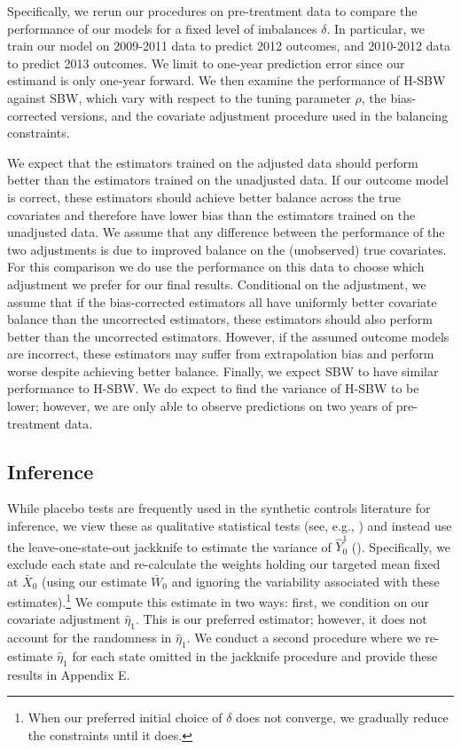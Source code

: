 \documentclass[aoas]{imsart}
\theoremstyle{plain}
\theoremstyle{remark}
\begin{document}
Specifically, we rerun our procedures on pre-treatment data to compare the performance of our models for a fixed level of imbalances $\delta$. In particular, we train our model on 2009-2011 data to predict 2012 outcomes, and 2010-2012 data to predict 2013 outcomes. We limit to one-year prediction error since our estimand is only one-year forward. We then examine the performance of H-SBW against SBW, which vary with respect to the tuning parameter $\rho$, the bias-corrected versions, and the covariate adjustment procedure used in the balancing constraints. 

We expect that the estimators trained on the adjusted data should perform better than the estimators trained on the unadjusted data. If our outcome model is correct, these estimators should achieve better balance across the true covariates and therefore have lower bias than the estimators trained on the unadjusted data. We assume that any difference between the performance of the two adjustments is due to improved balance on the (unobserved) true covariates. For this comparison we do use the performance on this data to choose which adjustment we prefer for our final results. Conditional on the adjustment, we assume that if the bias-corrected estimators all have uniformly better covariate balance than the uncorrected estimators, these estimators should also perform better than the uncorrected estimators. However, if the assumed outcome models are incorrect, these estimators may suffer from extrapolation bias and perform worse despite achieving better balance. Finally, we expect SBW to have similar performance to H-SBW. We do expect to find the variance of H-SBW to be lower; however, we are only able to observe predictions on two years of pre-treatment data.

\subsection{Inference}

While placebo tests are frequently used in the synthetic controls literature for inference, we view these as qualitative statistical tests (see, e.g., \cite{arkhangelsky2019synthetic}) and instead use the leave-one-state-out jackknife to estimate the variance of $\hat{Y}_0^1$ (\cite{cameron2015practitioner}). Specifically, we exclude each state and re-calculate the weights holding our targeted mean fixed at $\bar{X}_0$ (using our estimate $\bar{W}_0$ and ignoring the variability associated with these estimates).\footnote{When our preferred initial choice of $\delta$ does not converge, we gradually reduce the constraints until it does.} We compute this estimate in two ways: first, we condition on our covariate adjustment $\hat{\eta}_1$. This is our preferred estimator; however, it does not account for the randomness in $\hat{\eta}_1$. We conduct a second procedure where we re-estimate $\hat{\eta}_1$ for each state omitted in the jackknife procedure and provide these results in Appendix E.
\end{document}

